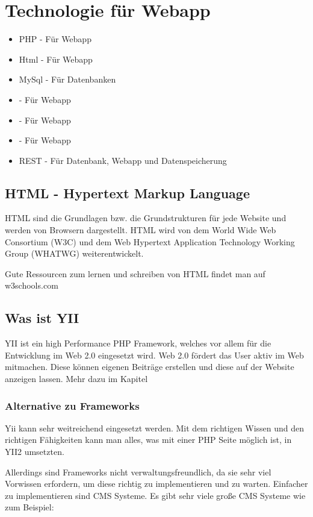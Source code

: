 \newpage	
\def \currentAuthor {Florian Tipotsch}
	\section{Technologie für Webapp}
\begin{itemize}
	\item PHP - Für Webapp
	\item Html - Für Webapp 	
	\item MySql - Für Datenbanken
	\item {} - Für Webapp
	\item {} - Für Webapp
	\item {} - Für Webapp
	\item REST - Für Datenbank, Webapp und Datenspeicherung
\end{itemize}
	\subsection{HTML - Hypertext Markup Language}
	HTML sind die Grundlagen bzw. die Grundstrukturen für jede Website und werden von Browsern dargestellt. HTML wird von dem World Wide Web Consortium (W3C) \cite{W3C} und dem Web Hypertext Application Technology Working Group (WHATWG) \cite{WHATWG} weiterentwickelt.
	
	Gute Ressourcen zum lernen und schreiben von HTML findet man auf w3schools.com \cite {W3schools}
	
	\subsection{Was ist YII}
	YII ist ein high Performance PHP Framework, welches vor allem für die Entwicklung im Web 2.0 eingesetzt wird. Web 2.0 fördert das User aktiv im Web mitmachen. Diese können eigenen Beiträge erstellen und diese auf der Website anzeigen lassen. Mehr dazu im Kapitel  \cite{Web_2}

	\subsubsection{Alternative zu Frameworks}
	Yii kann sehr weitreichend eingesetzt werden. Mit dem richtigen Wissen und den richtigen Fähigkeiten kann man alles, was mit einer PHP Seite möglich ist, in YII2 umsetzten.

Allerdings sind Frameworks nicht verwaltungsfreundlich, da sie sehr viel Vorwissen erfordern, um diese richtig zu implementieren und zu warten. Einfacher zu implementieren sind CMS Systeme. Es gibt sehr viele große CMS Systeme wie zum Beispiel:

